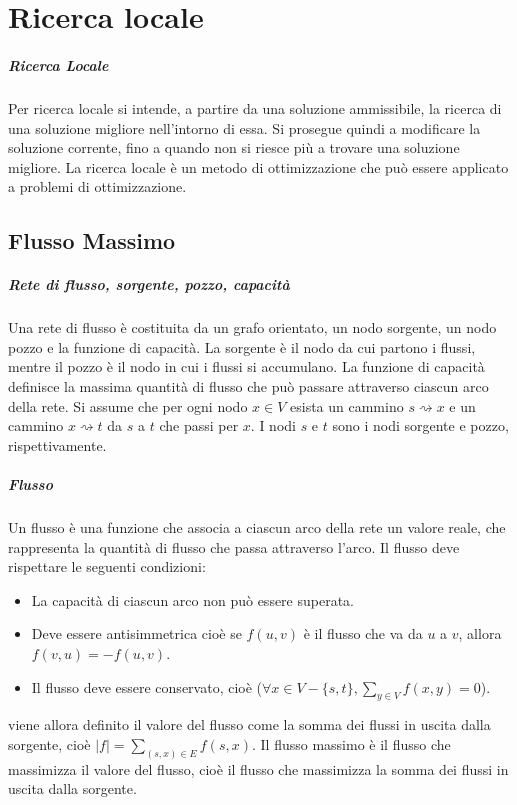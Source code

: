 \chapter{Ricerca locale}

\paragraph{Ricerca Locale}
    Per ricerca locale si intende, a partire da una soluzione ammissibile, la ricerca di una soluzione migliore nell'intorno di essa. Si prosegue quindi a modificare la soluzione corrente, fino a quando non si riesce più a trovare una soluzione migliore. La ricerca locale è un metodo di ottimizzazione che può essere applicato a problemi di ottimizzazione.

\section{Flusso Massimo}

    \paragraph{Rete di flusso, sorgente, pozzo, capacità}
        Una rete di flusso è costituita da un grafo orientato, un nodo sorgente, un nodo pozzo e la funzione di capacità. La sorgente è il nodo da cui partono i flussi, mentre il pozzo è il nodo in cui i flussi si accumulano. La funzione di capacità definisce la massima quantità di flusso che può passare attraverso ciascun arco della rete.\newline
        Si assume che per ogni nodo $x\in V$ esista un cammino $s \rightsquigarrow x$ e un cammino $x \rightsquigarrow t$ da $s$ a $t$ che passi per $x$. I nodi $s$ e $t$ sono i nodi sorgente e pozzo, rispettivamente.
    \paragraph{Flusso}
        Un flusso è una funzione che associa a ciascun arco della rete un valore reale, che rappresenta la quantità di flusso che passa attraverso l'arco. Il flusso deve rispettare le seguenti condizioni:
        \begin{itemize}
            \item La capacità di ciascun arco non può essere superata.
            \item Deve essere antisimmetrica cioè se $f(u,v)$ è il flusso che va da $u$ a $v$, allora $f(v,u) = -f(u,v)$.
            \item Il flusso deve essere conservato, cioè ($\forall x \in V-\{s,t\}, \sum_{y \in V} f(x,y) = 0$).
        \end{itemize}
        viene allora definito il valore del flusso come la somma dei flussi in uscita dalla sorgente, cioè $\displaystyle |f| = \sum_{(s,x)\in E} f(s,x)$.
        Il flusso massimo è il flusso che massimizza il valore del flusso, cioè il flusso che massimizza la somma dei flussi in uscita dalla sorgente. 
